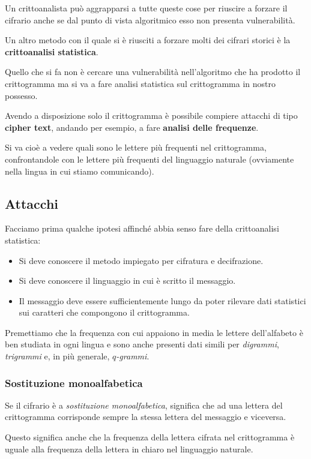 Un crittoanalista pu\`o aggrapparsi a tutte queste cose per riuscire a forzare il cifrario anche se dal punto di vista
algoritmico esso non presenta vulnerabilit\`a.

Un altro metodo con il quale si \`e riusciti a forzare molti dei cifrari storici \`e la \textbf{crittoanalisi statistica}.

Quello che si fa non \`e cercare una vulnerabilit\`a nell'algoritmo che ha prodotto il crittogramma ma si va a fare
analisi statistica sul crittogramma in nostro possesso.

Avendo a disposizione solo il crittogramma \`e possibile compiere attacchi di tipo \textbf{cipher text}, andando per
esempio, a fare \textbf{analisi delle frequenze}.

Si va cio\`e a vedere quali sono le lettere pi\`u frequenti nel crittogramma, confrontandole con le lettere pi\`u
frequenti del linguaggio naturale (ovviamente nella lingua in cui stiamo comunicando).

\subsection{Attacchi}
Facciamo prima qualche ipotesi affinch\'e abbia senso fare della crittoanalisi statistica:
\begin{itemize}
	\item Si deve conoscere il metodo impiegato per cifratura e decifrazione.
	\item Si deve conoscere il linguaggio in cui \`e scritto il messaggio.
	\item Il messaggio deve essere sufficientemente lungo da poter rilevare dati statistici sui caratteri che
	      compongono il crittogramma.
\end{itemize}
Premettiamo che la frequenza con cui appaiono in media le lettere dell'alfabeto \`e ben studiata in ogni lingua e sono
anche presenti dati simili per \emph{digrammi}, \emph{trigrammi} e, in pi\`u generale, $q$\emph{-grammi}.

\subsubsection{Sostituzione monoalfabetica}
Se il cifrario \`e a \emph{sostituzione monoalfabetica}, significa che ad una lettera del crittogramma corrisponde
sempre la stessa lettera del messaggio e viceversa.

Questo significa anche che la frequenza della lettera cifrata nel crittogramma \`e uguale alla frequenza della lettera in
chiaro nel linguaggio naturale.

